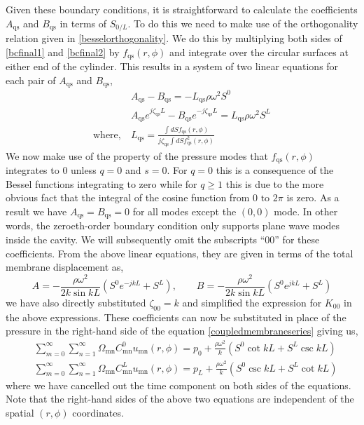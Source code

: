 Given these boundary conditions, it is straightforward to calculate the coefficients $A_{\mathrm{qs}}$ and $B_{\mathrm{qs}}$ in terms of $S_{0/L}$. To do this
we need to make use of the orthogonality relation given in \eqref{besselorthogonality}. We do this by multiplying both sides of \eqref{bcfinal1} and \eqref{bcfinal2}
by $f_{\mathrm{qs}}(r,\phi)$ and integrate over the circular surfaces at either end of the cylinder. This results in a system of two linear equations for each pair of $A_{\mathrm{qs}}$ 
and $B_{\mathrm{qs}}$,
\begin{align}
 &A_{\mathrm{qs}}-B_{\mathrm{qs}} = -L_{\mathrm{qs}}\rho\omega^2S^{0}\\
 &A_{\mathrm{qs}}e^{j\zeta_{\mathrm{qs}}L}-B_{\mathrm{qs}}e^{-j\zeta_{\mathrm{qs}}L} =  L_{\mathrm{qs}}\rho\omega^2S^{L}\\
 \mbox{where,}\ &L_{\mathrm{qs}} = \frac{\int dS f_{\mathrm{qs}}(r,\phi)}{j\zeta_{\mathrm{qs}}\int dS f^2_{\mathrm{qs}}(r,\phi)}\nonumber
\end{align}
We now make use of the property of the pressure modes that $f_{\mathrm{qs}}(r,\phi)$ integrates to $0$ unless $q=0$ and $s=0$. 
For $q=0$ this is a consequence of the Bessel functions integrating to zero while for $q\geq 1$ this is due to 
the more obvious fact that the integral of the cosine function from $0\mbox{ to }2\pi$ is zero. As a result we have $A_{\mathrm{qs}}=B_{\mathrm{qs}}=0$ for all
modes except the $(0,0)$ mode. In other words, the zeroeth-order boundary condition only supports plane wave
modes inside the cavity. We will subsequently omit the subscripts ``$00$'' for these coefficients.
From the above linear equations, they are given in terms of the total membrane displacement as,
\begin{equation}\label{finalpressurecoefficients}
 A=-\frac{\rho\omega^2}{2 k\sin kL}\left(S^0e^{-jkL}+S^L\right),\qquad  B=-\frac{\rho\omega^2}{2 k\sin kL}\left(S^0e^{jkL}+S^L\right)
\end{equation}
we have also directly substituted $\zeta_{00}=k$ and simplified the expression for $K_{00}$ in the above expressions. These
coefficients can now be substituted in place of the pressure in the right-hand side of the equation \eqref{coupledmembraneseries}
giving us,
\begin{align}
 &\displaystyle\sum^\infty_{m=0}\displaystyle\sum^\infty_{n=1}\Omega_{\mathrm{mn}}C^{0}_{\mathrm{mn}}u_{\mathrm{mn}}(r,\phi)=p_{0}+\frac{\rho\omega^2}{k}\left(S^0\cot kL+S^L\csc kL\right)\\
 &\displaystyle\sum^\infty_{m=0}\displaystyle\sum^\infty_{n=1}\Omega_{\mathrm{mn}}C^{L}_{\mathrm{mn}}u_{\mathrm{mn}}(r,\phi)=p_{L}+\frac{\rho\omega^2}{k}\left(S^0\csc kL+S^L\cot kL\right)
\end{align}
where we have cancelled out the time component on both sides of the equations. Note that the right-hand sides of the above two equations
are independent of the spatial $(r,\phi)$ coordinates.

